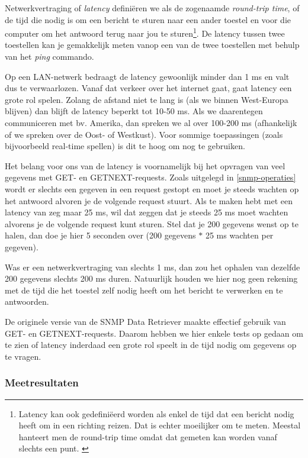 Netwerkvertraging of \textit{latency} definiëren we als de zogenaamde \textit{round-trip time},
of de tijd die nodig is om een bericht te sturen naar een ander toestel en voor die computer om het antwoord terug naar jou te sturen\footnote{
	Latency kan ook gedefiniëerd worden als enkel de tijd dat een bericht nodig heeft om in een richting reizen.
	Dat is echter moeilijker om te meten. Meestal hanteert men de round-trip time omdat dat gemeten kan worden vanaf slechts een punt. \cite{latency-wiki}
}.
De latency tussen twee toestellen kan je gemakkelijk meten vanop een van de twee toestellen met behulp van het \textit{ping} commando.

Op een LAN-netwerk bedraagt de latency gewoonlijk minder dan 1 ms en valt dus te verwaarlozen.
Vanaf dat verkeer over het internet gaat, gaat latency een grote rol spelen.
Zolang de afstand niet te lang is (als we binnen West-Europa blijven) dan blijft de latency beperkt tot 10-50 ms.
Als we daarentegen communiceren met bv. Amerika, dan spreken we al over 100-200 ms (afhankelijk of we spreken over de Oost- of Westkust).
Voor sommige toepassingen (zoals bijvoorbeeld real-time spellen) is dit te hoog om nog te gebruiken.

Het belang voor ons van de latency is voornamelijk bij het opvragen van veel gegevens met GET- en GETNEXT-requests.
Zoals uitgelegd in \cref{snmp-operaties} wordt er slechts een gegeven in een request gestopt en
moet je steeds wachten op het antwoord alvoren je de volgende request stuurt.
Als te maken hebt met een latency van zeg maar 25 ms, wil dat zeggen dat je steeds 25 ms moet wachten alvorens je de volgende request kunt sturen.
Stel dat je 200 gegevens wenst op te halen, dan doe je hier 5 seconden over (200 gegevens $*$ 25 ms wachten per gegeven).

Was er een netwerkvertraging van slechts 1 ms, dan zou het ophalen van dezelfde 200 gegevens slechts 200 ms duren.
Natuurlijk houden we hier nog geen rekening met de tijd die het toestel zelf nodig heeft om het bericht te verwerken en te antwoorden.

De originele versie van de SNMP Data Retriever maakte effectief gebruik van GET- en GETNEXT-requests.
Daarom hebben we hier enkele tests op gedaan om te zien of latency inderdaad een grote rol speelt in de tijd nodig om gegevens op te vragen.

\subsubsection{Meetresultaten}

